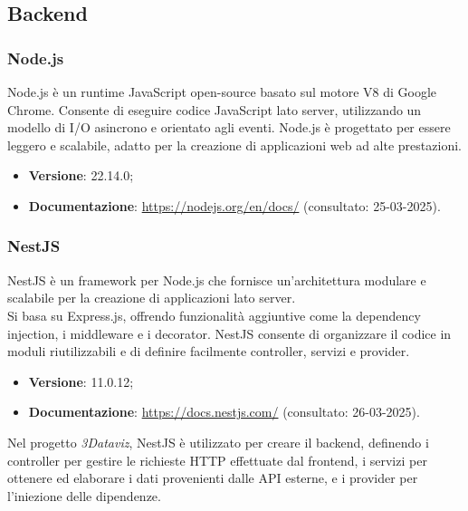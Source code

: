 \subsection{Backend}
\subsubsection{Node.js}
Node.js è un runtime JavaScript open-source basato sul motore V8 di Google
Chrome. Consente di eseguire codice JavaScript lato server, utilizzando un
modello di I/O asincrono e orientato agli eventi. Node.js è progettato per
essere leggero e scalabile, adatto per la creazione di applicazioni web ad alte
prestazioni.
\begin{itemize}
    \item \textbf{Versione}: 22.14.0;
    \item \textbf{Documentazione}: \url{https://nodejs.org/en/docs/} (consultato:
          25-03-2025).
\end{itemize}

\subsubsection{NestJS}
NestJS è un framework per Node.js che fornisce un'architettura modulare e
scalabile per la creazione di applicazioni lato server. \\Si basa su
Express.js, offrendo funzionalità aggiuntive come la dependency injection, i
middleware e i decorator. NestJS consente di organizzare il codice in moduli
riutilizzabili e di definire facilmente controller, servizi e provider.
\begin{itemize}
    \item \textbf{Versione}: 11.0.12;
    \item \textbf{Documentazione}: \url{https://docs.nestjs.com/} (consultato:
          26-03-2025).
\end{itemize}
Nel progetto \textit{3Dataviz}, NestJS è utilizzato per creare il backend,
definendo i controller per gestire le richieste HTTP effettuate dal frontend,
i servizi per ottenere ed elaborare i dati provenienti dalle API esterne, e i
provider per l'iniezione delle dipendenze.

